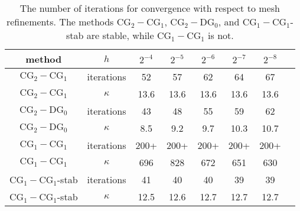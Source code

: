 \begin{table}
\begin{center}
\begin{tabular}{|c|c||c|c|c|c|c|c|}
\hline
method & $h$ & $2^{-4}$ & $2^{-5}$ & $2^{-6}$ & $2^{-7}$ & $2^{-8}$ \\ \hline\hline
$\mathrm{CG}_2-\mathrm{CG}_1$ &  iterations & 52 & 57 & 62 & 64 & 67 \\ \hline
$\mathrm{CG}_2-\mathrm{CG}_1$ & $\kappa $ & 13.6 & 13.6 & 13.6 & 13.6 & 13.6 \\ \hline
$\mathrm{CG}_2-\mathrm{DG}_0$ &  iterations & 43 & 48 & 55 & 59 & 62 \\ \hline
$\mathrm{CG}_2-\mathrm{DG}_0$ & $\kappa $ & 8.5 & 9.2 & 9.7 & 10.3 & 10.7 \\ \hline
$\mathrm{CG}_1-\mathrm{CG}_1$ & iterations & 200+ & 200+ & 200+ & 200+ & 200+ \\ \hline
$\mathrm{CG}_1-\mathrm{CG}_1$ & $\kappa$ & 696 & 828 & 672 & 651 & 630 \\ \hline
$\mathrm{CG}_1-\mathrm{CG}_1$-stab& iterations & 41 & 40 & 40 & 39 & 39 \\ \hline
$\mathrm{CG}_1-\mathrm{CG}_1$-stab& $\kappa $ & 12.5 & 12.6 & 12.7 & 12.7 & 12.7 \\ \hline
\end{tabular}
\caption{The number of iterations for
  convergence with respect to mesh refinements.
  The methods $\mathrm{CG}_2-\mathrm{CG}_1$, $\mathrm{CG}_2-\mathrm{DG}_0$, and $\mathrm{CG}_1-\mathrm{CG}_1$-stab are stable, while $\mathrm{CG}_1-\mathrm{CG}_1$ is not.}\label{stokes:ex}
\end{center}
\end{table}

